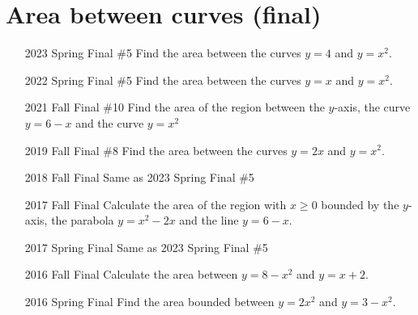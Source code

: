 \documentclass[10pt]{scrartcl}
\theoremstyle{definition}
\begin{document}
\section{Area between curves (final)}
\begin{enumerate}
\item[2023 Spring Final \#5] Find the area between the curves $y=4$ and $y=x^2$.
\item[2022 Spring Final \#5] Find the area between the curves $y=x$ and $y=x^2$.
\item[2021 Fall Final \#10] Find the area of the region between the $y$-axis, the curve $y=6-x$ and the curve $y=x^2$
\item[2019 Fall Final \#8] Find the area between the curves $y=2x$ and $y=x^2$.
\item[2018 Fall Final] Same as 2023 Spring Final \#5 %
\item[2017 Fall Final] Calculate the area of the region with $x\ge 0$ bounded by the $y$-axis, the parabola $y = x^2 - 2x$ and the line $y = 6-x$.
\item[2017 Spring Final] Same as 2023 Spring Final \#5 %
\item[2016 Fall Final] Calculate the area between $y = 8-x^2$ and $y = x+2$.
\item[2016 Spring Final] Find the area bounded between $y = 2x^2$ and $y = 3 - x^2$.
\end{enumerate}
\end{document}
